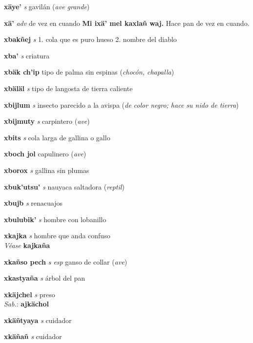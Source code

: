 \documentclass[10pt]{scrbook}
\newcommand{\entry}[1]{\textbf{#1}}
\newcommand{\onedefinition}[1]{#1.}
\newcommand{\partofspeech}[1]{\textit{#1}}
\newcommand{\spanishtranslation}[1]{#1}
\newcommand{\clarification}[1]{(\textit{#1})}
\newcommand{\cholexample}[1]{\textbf{#1}}
\newcommand{\exampletranslation}[1]{#1}
\newcommand{\dialectvariant}[1]{\\\textit{#1}:}
\newcommand{\dialectword}[1]{\textbf{#1}}
\newcommand{\alsosee}[1]{\\\textit{Véase} \textbf{#1}}
\begin{document}
\begin{multicols}{2}
\entry{xäye'}
\partofspeech{s}
\spanishtranslation{gavilán}
\clarification{ave grande}

\entry{xä'}
\partofspeech{adv}
\spanishtranslation{de vez en cuando}
\cholexample{Mi ixä' mel kaxlañ waj.}
\exampletranslation{Hace pan de vez en cuando.}

\entry{xbakñej}
\partofspeech{s}
\onedefinition{1}
\spanishtranslation{cola que es puro hueso}
\onedefinition{2}
\spanishtranslation{nombre del diablo}

\entry{xba'}
\partofspeech{s}
\spanishtranslation{criatura}

\entry{xbäk ch'ip}
\spanishtranslation{tipo de palma sin espinas}
\clarification{chocón, chapalla}

\entry{xbäläl}
\partofspeech{s}
\spanishtranslation{tipo de langosta de tierra caliente}

\entry{xbijlum}
\partofspeech{s}
\spanishtranslation{insecto parecido a la avispa}
\clarification{de color negro; hace su nido de tierra}

\entry{xbijmuty}
\partofspeech{s}
\spanishtranslation{carpintero}
\clarification{ave}

\entry{xbits}
\partofspeech{s}
\spanishtranslation{cola larga de gallina o gallo}

\entry{xboch jol}
\spanishtranslation{capulinero}
\clarification{ave}

\entry{xborox}
\partofspeech{s}
\spanishtranslation{gallina sin plumas}

\entry{xbuk'utsu'}
\partofspeech{s}
\spanishtranslation{nauyaca saltadora}
\clarification{reptil}

\entry{xbujb}
\partofspeech{s}
\spanishtranslation{renacuajos}

\entry{xbulubik'}
\partofspeech{s}
\spanishtranslation{hombre con lobanillo}

\entry{xkajka}
\partofspeech{s}
\spanishtranslation{hombre que anda confuso}
\alsosee{kajkaña}

\entry{xkañso pech}
\partofspeech{s esp}
\spanishtranslation{ganso de collar}
\clarification{ave}

\entry{xkastyaña}
\partofspeech{s}
\spanishtranslation{árbol del pan}

\entry{xkäjchel}
\partofspeech{s}
\spanishtranslation{preso}
\dialectvariant{Sab.}
\dialectword{ajkächol}

\entry{xkäñtyaya}
\partofspeech{s}
\spanishtranslation{cuidador}

\entry{xkäñañ}
\partofspeech{s}
\spanishtranslation{cuidador}


\end{multicols}
\end{document}
